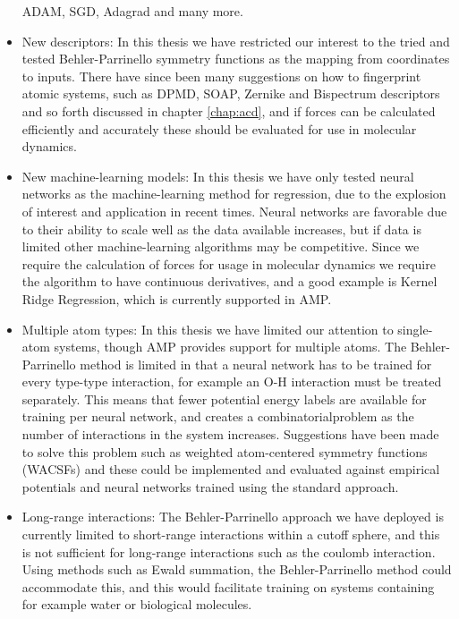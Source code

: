 \begin{itemize}
        ADAM, SGD, Adagrad and many more.
    \item New descriptors:
        In this thesis we have restricted our interest to the tried and tested
        Behler-Parrinello symmetry functions as the mapping from
        coordinates to inputs. There have since been many suggestions
        on how to fingerprint atomic systems, such as DPMD, SOAP,
        Zernike and Bispectrum descriptors and so forth discussed in chapter
        \ref{chap:acd},
        and if forces can be calculated efficiently and accurately
        these should be evaluated for use in molecular dynamics.
    \item New machine-learning models:
        In this thesis we have only tested neural networks as the
        machine-learning method for regression, due to the
        explosion of interest and application in recent times.
        Neural networks are favorable due to their ability to scale
        well as the data available increases, but if data is limited
        other machine-learning algorithms may be competitive.
        Since we require the calculation of forces for usage
        in molecular dynamics we require the algorithm to have
        continuous derivatives, and a good example is Kernel Ridge
        Regression, which is currently supported in AMP.
    \item Multiple atom types:
        In this thesis we have limited our attention to single-atom
        systems, though AMP provides support for multiple atoms.
        The Behler-Parrinello method is limited in that a neural network
        has to be trained for every type-type interaction, for example
        an O-H interaction must be treated separately. This means that
        fewer potential energy labels are available for training per neural
        network, and creates a combinatorialproblem as the number of interactions
        in the system increases. Suggestions have been made to solve this
        problem such as weighted atom-centered symmetry functions (WACSFs\cite{
            gastegger2018wacsf})
        and these could be implemented and evaluated against
        empirical potentials and neural networks trained using the standard
        approach.
    \item Long-range interactions:
        The Behler-Parrinello approach we have deployed is currently
        limited to short-range interactions within a cutoff sphere,
        and this is not sufficient for long-range interactions such
        as the coulomb interaction. Using methods such as Ewald summation\cite{
            toukmaji1996ewald},
        the Behler-Parrinello method could accommodate this, and this
        would facilitate training on systems containing for example
        water or biological molecules.
\end{itemize}

